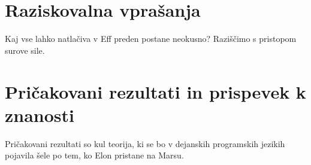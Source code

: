 \documentclass{article}
\begin{document}
\section*{Raziskovalna vprašanja}

Kaj vse lahko natlačiva v Eff preden postane neokusno? Raziščimo s pristopom surove sile.

\section*{Pričakovani rezultati in prispevek k znanosti}

Pričakovani rezultati so kul teorija, ki se bo v dejanskih programskih jezikih pojavila šele po tem, ko Elon pristane na Marsu.

\renewcommand\refname{Literatura}


\end{document}
